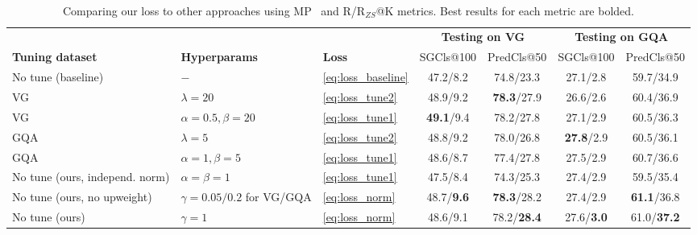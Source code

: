 \begin{table}
\begin{center}
\begin{minipage}{.46\linewidth}
		\end{minipage}
		\smallskip \smallskip \smallskip \smallskip \smallskip \smallskip \\
		\caption{\small Comparing our loss to other approaches using MP~\citep{xu2017scene,zellers2018neural} and R/R$_{ZS}$@K metrics. Best results for each metric are bolded.}\label{table:loss_ablations}
		\setlength{\tabcolsep}{1.2pt}
		\begin{tabular}{l|ll|cc|cc}
			\toprule
			\multicolumn{1}{c|}{} & \multicolumn{2}{c|}{} & \multicolumn{2}{c|}{\textbf{Testing on VG}} & \multicolumn{2}{c}{\textbf{Testing on GQA}}\Tstrut\\
			\multirow{1}{*}{\textbf{Tuning dataset}} &
			\multirow{1}{*}{\textbf{Hyperparams}} & 
			\multirow{1}{*}{\textbf{Loss}} & \multicolumn{1}{c}{{SGCls@100}} & \multicolumn{1}{c|}{{PredCls@50}} & \multicolumn{1}{c}{{SGCls@100}} & \multicolumn{1}{c}{{PredCls@50}} \Tstrut\Bstrut\\
			\midrule
			No tune (baseline) & $-$ & \eqref{eq:loss_baseline} & 47.2/8.2 & 74.8/23.3 & 27.1/2.8 & 59.7/34.9 \Tstrut \Bstrut\\
			\hline
			VG & $\lambda=20$ & \eqref{eq:loss_tune2} & 48.9/9.2 & \textbf{78.3}/27.9 & 26.6/2.6 & 60.4/36.9 \Tstrut \\
			VG & $\alpha=0.5, \beta=20$ & \eqref{eq:loss_tune1} & \textbf{49.1}/9.4 & 78.2/27.8 & 27.1/2.9 & 60.5/36.3  \\
			GQA & $\lambda=5$ & \eqref{eq:loss_tune2} & 48.8/9.2 & 78.0/26.8 & \textbf{27.8}/2.9 & 60.5/36.1 \\
			GQA & $\alpha=1, \beta=5$ & \eqref{eq:loss_tune1} & 48.6/8.7 & 77.4/27.8 & 27.5/2.9 & 60.7/36.6 \Bstrut \\
			\hline
			No tune (ours, independ. norm) & $\alpha=\beta=1$ & \eqref{eq:loss_tune1} & 47.5/8.4 & 74.3/25.3 & 27.4/2.9 & 59.5/35.4 \Tstrut\\
			No tune (ours, no upweight) & $\gamma=0.05/0.2$ for VG/GQA & \eqref{eq:loss_norm} & 48.7/\textbf{9.6} & \textbf{78.3}/28.2 & 27.4/2.9 & \textbf{61.1}/36.8 \\
			No tune (ours) & $\gamma=1$ & \eqref{eq:loss_norm} & 48.6/9.1 & 78.2/\textbf{28.4} & 27.6/\textbf{3.0} & 61.0/\textbf{37.2} \\
			\bottomrule
		\end{tabular}
	\end{center}
\end{table}

